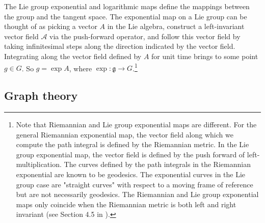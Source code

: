 \documentclass{article}
\begin{document}
The Lie group exponential and logarithmic maps define the mappings between the group and the tangent space. The exponential map on a Lie group can be thought of as picking a vector $A$ in the Lie algebra, construct a left-invariant vector field $\mathcal{A}$ via the push-forward operator, and follow this vector field by taking infinitesimal steps along the direction indicated by the vector field. Integrating along the vector field defined by $A$ for unit time brings to some point $g \in G$. So $g = \exp A$, where $\exp: \mathfrak{g} \to G$.\footnote{Note that Riemannian and Lie group exponential maps are different. For the general Riemannian exponential map, the vector field along which we compute the path integral is defined by the Riemannian metric. In the Lie group exponential map, the vector field is defined by the push forward of left-multiplication. The curves defined by the path integrals in the Riemannian exponential are known to be geodesics. The exponential curves in the Lie group case are "straight curves" with respect to a moving frame of reference but are not necessarily geodesics. The Riemannian and Lie group exponential maps only coincide when the Riemannian metric is both left and right invariant (see Section 4.5 in \citet{bekkers2017thesis}).}



\subsection{Graph theory} \label{app:graph_theory}
\end{document}
